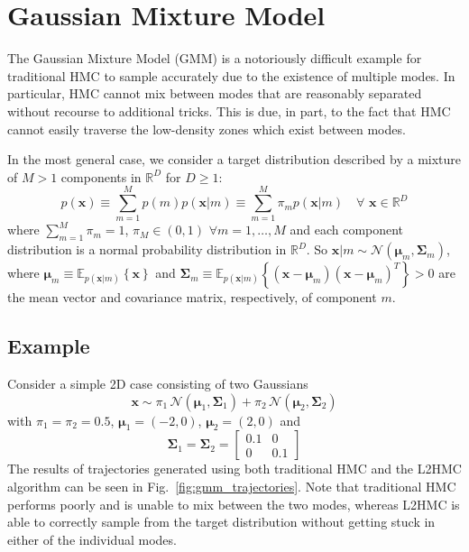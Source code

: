 \documentclass[../main.tex]{subfiles}
\begin{document}
\section{Gaussian Mixture Model}%
\label{sec:l2hmc_gmm}
%
The Gaussian Mixture Model (GMM) is a notoriously difficult example for traditional HMC to sample accurately due to the
existence of multiple modes.
%
In particular, HMC cannot mix between modes that are reasonably separated without recourse to additional tricks.
%
This is due, in part, to the fact that HMC cannot easily traverse the low-density zones which exist between modes.

In the most general case, we consider a target distribution described by a mixture of $M > 1$ components in
$\mathbb{R}^{D}$ for $D \geq 1$:
%
\begin{equation}
    p(\mathbf{x}) \equiv \sum_{m=1}^{M} p(m) p(\mathbf{x}|m) \equiv
        \sum_{m=1}^{M} \pi_m p(\mathbf{x}|m) \quad \forall \,\,\mathbf{x} \in
        \mathbb{R}^{D}
    \label{eq:gmm_model}
\end{equation}
%
where $\sum_{m=1}^{M} \pi_m = 1$, $\pi_M \in (0, 1)$ $\forall m = 1, \ldots, M$ and each component distribution is a
normal probability distribution in $\mathbb{R}^{D}$.
%
So $\mathbf{x}|m \sim \mathcal{N}(\bm{\mu}_m, \bm{\Sigma}_m)$, where $\bm{\mu}_m \equiv
\mathbb{E}_{p{(\mathbf{x}|m)}}\left\{\mathbf{x}\right\}$ and $\mathbf{\Sigma}_m \equiv
\mathbb{E}_{p{(\mathbf{x}|m)}}{\left\{{(\mathbf{x} - \bm{\mu}_m)}{(\mathbf{x} - \bm{\mu}_m)}^{T}\right\}} > 0$ are the
mean vector and covariance matrix, respectively, of component $m$.
%
\subsection{Example}
%
Consider a simple 2D case consisting of two Gaussians 
%
\begin{equation}
    \mathbf{x} \sim \pi_1 \,\mathcal{N}(\bm{\mu}_1, \bm{\Sigma}_1) +
        \pi_2\, \mathcal{N}(\bm{\mu}_2, \bm{\Sigma}_2)
    \label{eq:log_likelihood_example}
\end{equation}
%
with $\pi_1 = \pi_2 = 0.5$, $\bm{\mu}_1 = (-2, 0)$, $\bm{\mu}_2 = (2, 0)$ and
%
\begin{equation}
    \bm{\Sigma}_1 = \bm{\Sigma}_2 = 
        \begin{bmatrix}
            0.1    & 0 \\
            0       & 0.1 
        \end{bmatrix}
    \label{eq:covariance_matrix}
\end{equation}
%
The results of trajectories generated using both traditional HMC and the L2HMC algorithm can be seen in
Fig.~\ref{fig:gmm_trajectories}.
%
Note that traditional HMC performs poorly and is unable to mix between the two modes, whereas L2HMC is able to
correctly sample from the target distribution without getting stuck in either of the individual modes.
\end{document}
